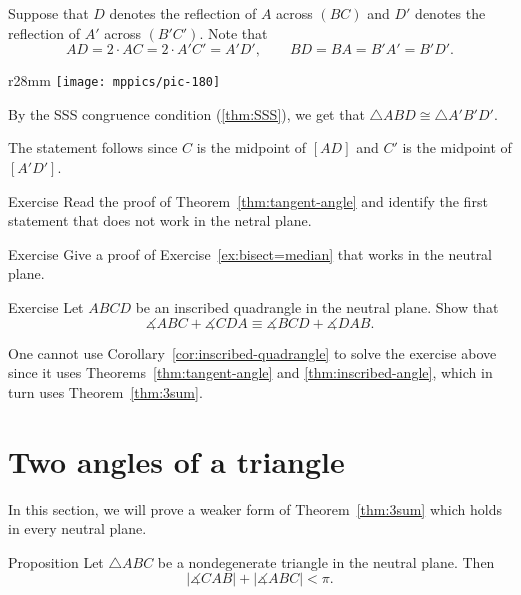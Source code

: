 Suppose that $D$ denotes the reflection of $A$ across $(BC)$
and $D'$ denotes the reflection of $A'$ across $(B'C')$.
Note that 
$$
AD=2\cdot AC=2\cdot A'C'=A'D',\qquad
BD=BA=B'A'=B'D'.
$$

{

\begin{wrapfigure}{r}{28mm}
\vskip-0mm
\centering
\texttt{[image: mppics/pic-180]}
\end{wrapfigure}

By the SSS congruence condition (\ref{thm:SSS}), 
we get that $\triangle ABD\cong \triangle A'B'D'$.

The statement follows since $C$ is the midpoint of $[AD]$
and $C'$ is the midpoint of $[A'D']$.  
\qeds

\begin{thm}{Exercise}\label{ex:tangent-angle-neutral}
Read the proof of Theorem~\ref{thm:tangent-angle} and identify the first statement that does not work in the netral plane.
\end{thm}

}


\begin{thm}{Exercise}\label{ex:abs-bisect=median}
Give a proof of Exercise~\ref{ex:bisect=median}
that works in the neutral plane. 
\end{thm}



\begin{thm}{Exercise}\label{ex:abs-inscibed}
Let $ABCD$ be an inscribed quadrangle in the neutral plane.
Show that
$$\measuredangle ABC+\measuredangle CDA\equiv \measuredangle BCD+\measuredangle DAB.$$

\end{thm}

One cannot use Corollary~\ref{cor:inscribed-quadrangle} to solve the exercise above since it uses Theorems~\ref{thm:tangent-angle} and \ref{thm:inscribed-angle},
which in turn uses Theorem~\ref{thm:3sum}.


\section{Two angles of a triangle}

In this section, we will prove a weaker form of Theorem~\ref{thm:3sum}
which holds in every neutral plane.

\begin{thm}{Proposition}\label{prop:2sum}
Let $\triangle ABC$ be a nondegenerate triangle in the neutral plane.
Then 
$$|\measuredangle CAB|+|\measuredangle ABC|< \pi.$$

\end{thm}

